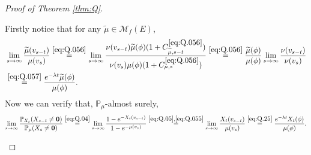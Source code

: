 \documentclass[12pt,a4paper]{amsart}
\numberwithin{equation}{section}
\theoremstyle{plain}
\theoremstyle{definition}
\theoremstyle{remark}
\newenvironment{proof*}[1][\proofname]{
	\renewcommand\qedsymbol{\rule{3mm}{3mm}}
	\begin{proof}[#1]}{\end{proof}}
\begin{document}
\begin{proof}[Proof of Theorem \ref{thm:Q}]
\begin{proof*}
	Firstly notice that for any $\widetilde \mu\in \mathcal M_f(E)$,
\begin{align}  
	&\lim_{s\rightarrow\infty}\dfrac{ \widetilde \mu(v_{s-t}) }{ \mu(v_s) } 
	\overset{\eqref{eq:Q.056}}=\lim_{s\to \infty} \frac{\nu(v_{s-t})\widetilde \mu (\phi) (1+C_{\widetilde \mu,s-t}^{\eqref{eq:Q.056}})}{\nu(v_s)\mu(\phi)(1+C_{\mu,s}^{\eqref{eq:Q.056}})}
	\overset{\eqref{eq:Q.056}}= \frac{\widetilde \mu(\phi)}{\mu(\phi)}\lim_{s\to \infty} \frac{\nu(v_{s-t}) }{\nu(v_s)}
	\\\label{eq:Q.25}&\overset{\eqref{eq:Q.057}}= \frac{e^{-\lambda t} \widetilde \mu(\phi)}{\mu(\phi)}. 
\end{align}
	Now we can verify that, $\mathbb P_\mu$-almost surely,
\begin{equation}
	\lim_{s\to\infty}\frac{\mathbb P_{X_t}(X_{s-t}\neq \mathbf 0)}{\mathbb P_\mu(X_s\neq \mathbf 0)}
	\overset{\eqref{eq:Q.04}}=\lim_{s\to\infty}\frac{1-e^{- X_t(v_{s-t}) }}{1-e^{- \mu(v_s) }}
	\overset{\eqref{eq:Q.05},\eqref{eq:Q.055}}=\lim_{s\rightarrow\infty}\dfrac{ X_t(v_{s-t}) }{ \mu(v_s) }
	\overset{\eqref{eq:Q.25}}= \frac{e^{-\lambda t} X_t(\phi)}{\mu(\phi)}.
	\qedhere
\end{equation}
\end{proof*}

\end{proof}
\end{document}
